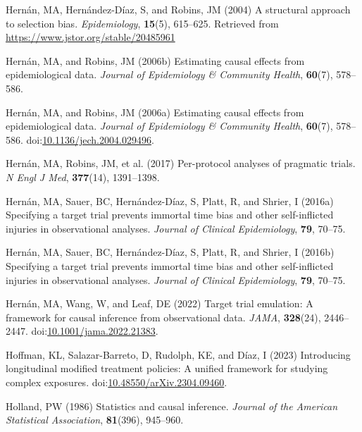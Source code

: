 \documentclass[
  single column]{article}
\newlength{\cslhangindent}
\newenvironment{CSLReferences}[2] %
 {\begin{list}{}{%
  \setlength{\itemindent}{0pt}
  \setlength{\leftmargin}{0pt}
  \setlength{\parsep}{0pt}
  \ifodd #1
   \setlength{\leftmargin}{\cslhangindent}
   \setlength{\itemindent}{-1\cslhangindent}
  \fi
  \setlength{\itemsep}{#2\baselineskip}}}
 {\end{list}}
\begin{document}
\begin{CSLReferences}{1}{0}
Hernán, MA, Hernández-Díaz, S, and Robins, JM (2004) A structural
approach to selection bias. \emph{Epidemiology}, \textbf{15}(5),
615--625. Retrieved from \url{https://www.jstor.org/stable/20485961}

Hernán, MA, and Robins, JM (2006b) Estimating causal effects from
epidemiological data. \emph{Journal of Epidemiology \& Community
Health}, \textbf{60}(7), 578--586.

Hernán, MA, and Robins, JM (2006a) Estimating causal effects from
epidemiological data. \emph{Journal of Epidemiology \& Community
Health}, \textbf{60}(7), 578--586.
doi:\href{https://doi.org/10.1136/jech.2004.029496}{10.1136/jech.2004.029496}.

Hernán, MA, Robins, JM, et al. (2017) Per-protocol analyses of pragmatic
trials. \emph{N Engl J Med}, \textbf{377}(14), 1391--1398.

Hernán, MA, Sauer, BC, Hernández-Díaz, S, Platt, R, and Shrier, I
(2016a) Specifying a target trial prevents immortal time bias and other
self-inflicted injuries in observational analyses. \emph{Journal of
Clinical Epidemiology}, \textbf{79}, 70--75.

Hernán, MA, Sauer, BC, Hernández-Díaz, S, Platt, R, and Shrier, I
(2016b) Specifying a target trial prevents immortal time bias and other
self-inflicted injuries in observational analyses. \emph{Journal of
Clinical Epidemiology}, \textbf{79}, 70--75.

Hernán, MA, Wang, W, and Leaf, DE (2022) Target trial emulation: A
framework for causal inference from observational data. \emph{JAMA},
\textbf{328}(24), 2446--2447.
doi:\href{https://doi.org/10.1001/jama.2022.21383}{10.1001/jama.2022.21383}.

Hoffman, KL, Salazar-Barreto, D, Rudolph, KE, and Díaz, I (2023)
Introducing longitudinal modified treatment policies: A unified
framework for studying complex exposures.
doi:\href{https://doi.org/10.48550/arXiv.2304.09460}{10.48550/arXiv.2304.09460}.

Holland, PW (1986) Statistics and causal inference. \emph{Journal of the
American Statistical Association}, \textbf{81}(396), 945--960.


\end{CSLReferences}
\end{document}
